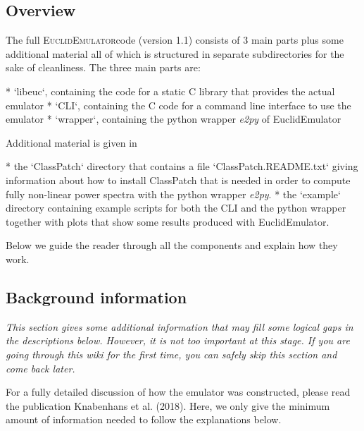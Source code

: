 \documentclass[american,11pt]{article}
\begin{document}
\subsection{Overview}
The full \textsc{EuclidEmulator}code (version 1.1) consists of 3 main parts plus some additional material all of which is structured in separate subdirectories for the sake of cleanliness. The three main parts are:

* `libeuc`, containing the code for a static C library that provides the actual emulator
* `CLI`, containing the C code for a command line interface to use the emulator
* `wrapper`, containing the python wrapper \textit{e2py} of EuclidEmulator

Additional material is given in

* the `ClassPatch` directory that contains a file `ClassPatch.README.txt` giving information about how to install ClassPatch that is needed in order to compute fully non-linear power spectra with the python wrapper \textit{e2py}.
* the `example` directory containing example scripts for both the CLI and the python wrapper together with plots that show some results produced with EuclidEmulator.

Below we guide the reader through all the components and explain how they work.

\subsection{Background information}

\textit{This section gives some additional information that may fill some logical gaps in the descriptions below. However, it is not too important at this stage. If you are going through this wiki for the first time, you can safely skip this section and come back later.}

For a fully detailed discussion of how the emulator was constructed, please read the publication Knabenhans et al. (2018). Here, we only give the minimum amount of information needed to follow the explanations below.
\end{document}
